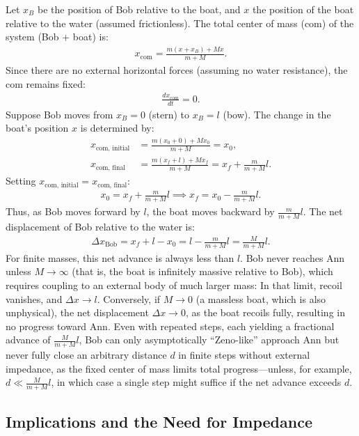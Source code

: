 \documentclass[reprint,aps,pra,superscriptaddress,longbibliography]{revtex4-2}
\begin{document}
Let $x_B$ be the position of Bob relative to the boat, and $x$ the position of the boat relative to the water (assumed frictionless). The total center of mass (com) of the system (Bob + boat) is:
\begin{align}
    x_{\text{com}} = \frac{m (x + x_B) + M x}{m + M}.
\end{align}
Since there are no external horizontal forces (assuming no water resistance), the com remains fixed:
\begin{align}
    \frac{d x_{\text{com}}}{dt} = 0.
\end{align}
Suppose Bob moves from $x_B = 0$ (stern) to $x_B = l$ (bow). The change in the boat's position $x$ is determined by:
\begin{align}
    x_{\text{com, initial}} &= \frac{m (x_0 + 0) + M x_0}{m + M} = x_0, \\
    x_{\text{com, final}} &= \frac{m (x_f + l) + M x_f}{m + M} = x_f + \frac{m}{m + M} l.
\end{align}
Setting $x_{\text{com, initial}} = x_{\text{com, final}}$:
\begin{align}
    x_0 = x_f + \frac{m}{m + M} l \implies x_f = x_0 - \frac{m}{m + M} l.
\end{align}
Thus, as Bob moves forward by $l$, the boat moves backward by $\frac{m}{m + M} l$. The net displacement of Bob relative to the water is:
\begin{align}
    \Delta x_{\text{Bob}} = x_f + l - x_0 = l - \frac{m}{m + M} l = \frac{M}{m + M} l.
\end{align}
For finite masses, this net advance is always less than $l$.
Bob never reaches Ann unless $M \to \infty$ (that is, the boat is infinitely massive relative to Bob),
which requires coupling to an external body of much larger mass:
In that limit, recoil vanishes, and $\Delta x \to l$.
Conversely, if $M \to 0$ (a massless boat, which is also unphysical), the net displacement $\Delta x \to 0$, as the boat recoils fully,
resulting in no progress toward Ann.
Even with repeated steps, each yielding a fractional advance of $\frac{M}{m + M} l$,
Bob can only asymptotically ``Zeno-like'' approach Ann but never fully close an arbitrary distance $d$
in finite steps without external impedance, as the fixed center of mass limits total progress---unless,
for example, $d \ll \frac{M}{m + M} l$,
in which case a single step might suffice if the net advance exceeds $d$.

\subsection{Implications and the Need for Impedance}
\end{document}
